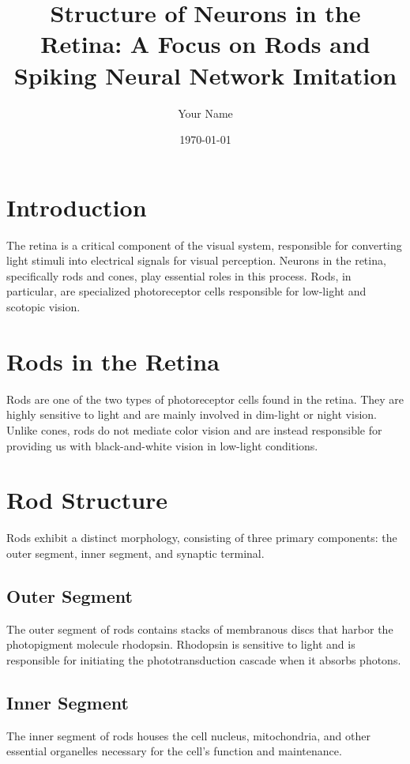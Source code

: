 \documentclass{article}
\title{Structure of Neurons in the Retina: A Focus on Rods and Spiking Neural Network Imitation}
\author{Your Name}
\date{\today}
\begin{document}
\maketitle

\section{Introduction}

The retina is a critical component of the visual system, responsible for converting light stimuli into electrical signals for visual perception. Neurons in the retina, specifically rods and cones, play essential roles in this process. Rods, in particular, are specialized photoreceptor cells responsible for low-light and scotopic vision.

\section{Rods in the Retina}

Rods are one of the two types of photoreceptor cells found in the retina. They are highly sensitive to light and are mainly involved in dim-light or night vision. Unlike cones, rods do not mediate color vision and are instead responsible for providing us with black-and-white vision in low-light conditions.

\section{Rod Structure}

Rods exhibit a distinct morphology, consisting of three primary components: the outer segment, inner segment, and synaptic terminal.

\subsection{Outer Segment}

The outer segment of rods contains stacks of membranous discs that harbor the photopigment molecule rhodopsin. Rhodopsin is sensitive to light and is responsible for initiating the phototransduction cascade when it absorbs photons.

\subsection{Inner Segment}

The inner segment of rods houses the cell nucleus, mitochondria, and other essential organelles necessary for the cell's function and maintenance.
\end{document}
